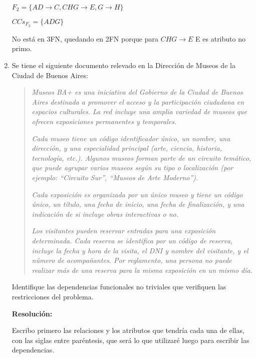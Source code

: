 \documentclass[a4paper,12pt]{article}
\begin{document}
\begin{enumerate}[label=\textbf{\arabic*.}]
$F_2=\{AD\rightarrow C, CHG \rightarrow E, G \rightarrow H\}$

$CCs_{F_2}=\{ADG\}$

No está en 3FN, quedando en 2FN porque para $CHG\rightarrow E$ E es atributo no primo.

    \item Se tiene el siguiente documento relevado en la Dirección de Museos de la Ciudad de Buenos Aires:

    \begin{quote}
        \textit{Museos BA+ es una iniciativa del Gobierno de la Ciudad de Buenos Aires destinada a promover el acceso y la participación ciudadana en espacios culturales. La red incluye una amplia variedad de museos que ofrecen exposiciones permanentes y temporales.}

        \textit{Cada museo tiene un código identificador único, un nombre, una dirección, y una especialidad principal (arte, ciencia, historia, tecnología, etc.). Algunos museos forman parte de un circuito temático, que puede agrupar varios museos según su tipo o localización (por ejemplo: ``Circuito Sur'', ``Museos de Arte Moderno'').}

        \textit{Cada exposición es organizada por un único museo y tiene un código único, un título, una fecha de inicio, una fecha de finalización, y una indicación de si incluye obras interactivas o no.}

        \textit{Los visitantes pueden reservar entradas para una exposición determinada. Cada reserva se identifica por un código de reserva, incluye la fecha y hora de la visita, el DNI y nombre del visitante, y el número de acompañantes. Por reglamento, una persona no puede realizar más de una reserva para la misma exposición en un mismo día.}
    \end{quote}

    Identifique las dependencias funcionales no triviales que verifiquen las restricciones del problema.

    \vspace{0.4cm}

    \textbf{Resolución:}

    \vspace{0.2cm}

    Escribo primero las relaciones y los atributos que tendría cada una de ellas, con las siglas entre paréntesis, que será lo que utilizaré luego para escribir las dependencias.

    \vspace{0.2cm}


\end{enumerate}
\end{document}
